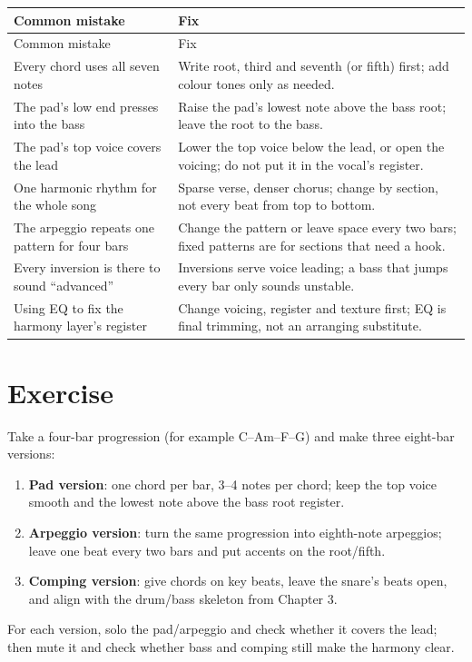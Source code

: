 \begin{longtable}{p{}p{}}
\toprule
Common mistake & Fix \\
\midrule
\endfirsthead
\toprule
Common mistake & Fix \\
\midrule
\endhead
Every chord uses all seven notes & Write root, third and seventh (or fifth) first; add colour tones only as needed. \\
The pad's low end presses into the bass & Raise the pad's lowest note above the bass root; leave the root to the bass. \\
The pad's top voice covers the lead & Lower the top voice below the lead, or open the voicing; do not put it in the vocal's register. \\
One harmonic rhythm for the whole song & Sparse verse, denser chorus; change by section, not every beat from top to bottom. \\
The arpeggio repeats one pattern for four bars & Change the pattern or leave space every two bars; fixed patterns are for sections that need a hook. \\
Every inversion is there to sound ``advanced'' & Inversions serve voice leading; a bass that jumps every bar only sounds unstable. \\
Using EQ to fix the harmony layer's register & Change voicing, register and texture first; EQ is final trimming, not an arranging substitute. \\
\bottomrule
\end{longtable}

\section{Exercise}
\label{sec:harmony-exercise}

\begin{exercise}
Take a four-bar progression (for example C--Am--F--G) and make three eight-bar versions:
\begin{enumerate}
\item \textbf{Pad version}: one chord per bar, 3--4 notes per chord; keep the top voice smooth and the lowest note above the bass root register.
\item \textbf{Arpeggio version}: turn the same progression into eighth-note arpeggios; leave one beat every two bars and put accents on the root/fifth.
\item \textbf{Comping version}: give chords on key beats, leave the snare's beats open, and align with the drum/bass skeleton from Chapter 3.
\end{enumerate}
For each version, solo the pad/arpeggio and check whether it covers the lead; then mute it and check whether bass and comping still make the harmony clear.
\end{exercise}

